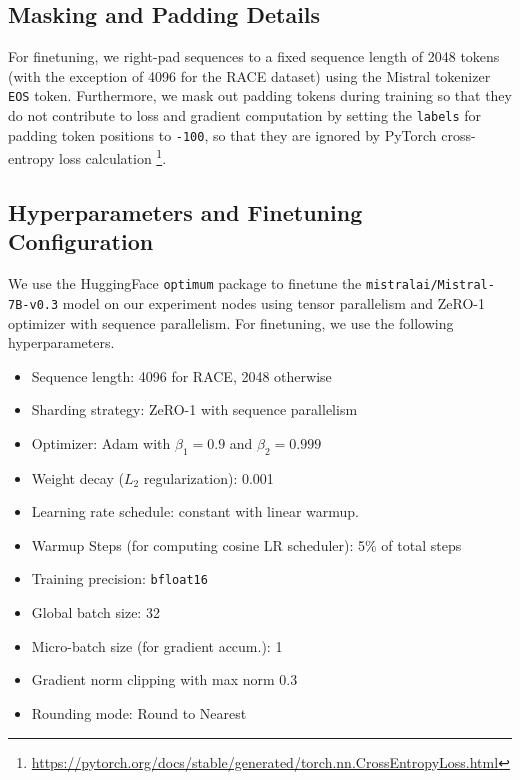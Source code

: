 \subsection{Masking and Padding Details}

For finetuning, we right-pad sequences to a fixed sequence length of 2048 tokens (with the exception of 4096 for the RACE dataset) using the Mistral tokenizer \verb|EOS| token. Furthermore, we mask out padding tokens during training so that they do not contribute to loss and gradient computation by setting the \verb|labels| for padding token positions to \verb|-100|, so that they are ignored by PyTorch cross-entropy loss calculation \footnote{\url{https://pytorch.org/docs/stable/generated/torch.nn.CrossEntropyLoss.html}}.
\subsection{Hyperparameters and Finetuning Configuration}

We use the HuggingFace \verb|optimum| package to finetune the \verb|mistralai/Mistral-7B-v0.3| model on our experiment nodes using tensor parallelism and ZeRO-1 optimizer with sequence parallelism. For finetuning, we use the following hyperparameters.

\begin{itemize}
    \item Sequence length: 4096 for RACE, 2048 otherwise
    \item Sharding strategy: ZeRO-1 with sequence parallelism
    \item Optimizer: Adam with $\beta_1 = 0.9$ and $\beta_2 = 0.999$
    \item Weight decay ($L_2$ regularization): 0.001
    \item Learning rate schedule: constant with linear warmup.
    \item Warmup Steps (for computing cosine LR scheduler): 5\% of total steps
    \item Training precision: \verb|bfloat16|
    \item Global batch size: 32
    \item Micro-batch size (for gradient accum.): 1
    \item Gradient norm clipping with max norm 0.3
    \item Rounding mode: Round to Nearest
\end{itemize}

